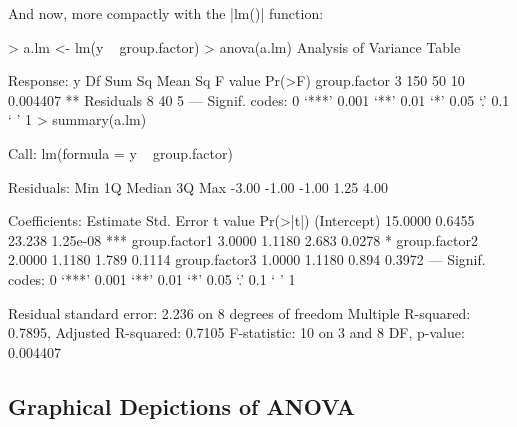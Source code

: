 And now, more compactly with the |lm()| function:
\begin{R}
> a.lm <- lm(y ~ group.factor)
> anova(a.lm)
Analysis of Variance Table

Response: y
             Df Sum Sq Mean Sq F value   Pr(>F)
group.factor  3    150      50      10 0.004407 **
Residuals     8     40       5
---
Signif. codes:  0 ‘***’ 0.001 ‘**’ 0.01 ‘*’ 0.05 ‘.’ 0.1 ‘ ’ 1
> summary(a.lm)

Call:
lm(formula = y ~ group.factor)

Residuals:
   Min     1Q Median     3Q    Max
 -3.00  -1.00  -1.00   1.25   4.00

Coefficients:
              Estimate Std. Error t value Pr(>|t|)
(Intercept)    15.0000     0.6455  23.238 1.25e-08 ***
group.factor1   3.0000     1.1180   2.683   0.0278 *
group.factor2   2.0000     1.1180   1.789   0.1114
group.factor3   1.0000     1.1180   0.894   0.3972
---
Signif. codes:  0 ‘***’ 0.001 ‘**’ 0.01 ‘*’ 0.05 ‘.’ 0.1 ‘ ’ 1

Residual standard error: 2.236 on 8 degrees of freedom
Multiple R-squared: 0.7895, Adjusted R-squared: 0.7105
F-statistic:    10 on 3 and 8 DF,  p-value: 0.004407
\end{R}

\subsection{Graphical Depictions of ANOVA}

